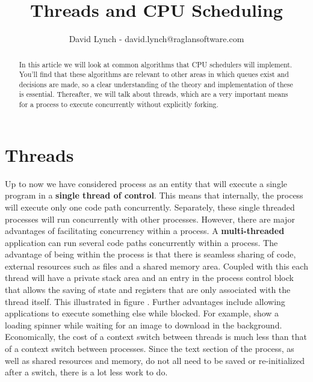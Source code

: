 \documentclass[10pt,a4paper]{article}
\title{Threads and CPU Scheduling}
\author{David Lynch - david.lynch@raglansoftware.com }
\begin{document}
\maketitle
\begin{abstract}
In this article we will look at common algorithms that CPU schedulers will implement. You'll find that these algorithms are relevant to other areas in which queues exist and decisions are made, so a clear understanding of the theory and implementation of these is essential. Thereafter, we will talk about threads, which are a very important means for a process to execute concurrently without explicitly forking. 
\end{abstract}
\section{Threads}
Up to now we have considered process as an entity that will execute a single program in a {\bf single thread of control}. This means that internally, the process will execute only one code path concurrently. Separately, these single threaded processes will run concurrently with other processes. However, there are major advantages of facilitating concurrency within a process. A {\bf multi-threaded} application can run several code paths concurrently within a process. The advantage of being within the process is that there is seamless sharing of code, external resources such as files and a shared memory area. Coupled with this each thread will have a private stack area and an entry in the process control block that allows the saving of state and registers that are only associated with the thread itself. This illustrated in figure \cite{processthread}. Further advantages include allowing applications to execute something else while blocked. For example, show a loading spinner while waiting for an image to download in the background. Economically, the cost of a context switch between threads is much less than that of a context switch between processes. Since the text section of the process, as well as shared resources and memory, do not all need to be saved or re-initialized after a switch, there is a lot less work to do. 
\end{document}
